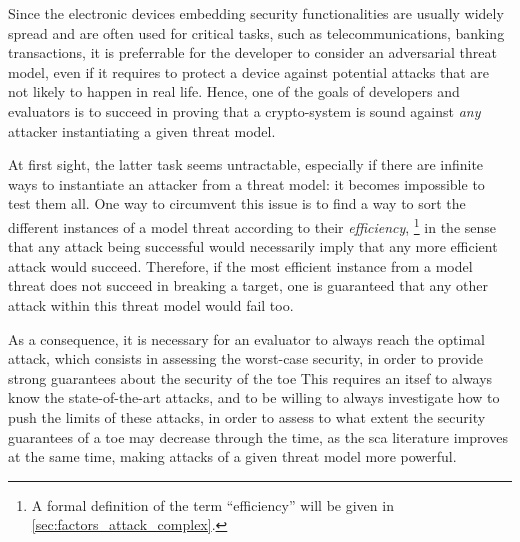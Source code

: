 Since the electronic devices embedding security functionalities are usually widely spread and are often used for critical tasks, such as telecommunications, banking transactions, \etc{} it is preferrable for the developer to consider an adversarial threat model, even if it requires to protect a device against potential attacks that are not likely to happen in real life.
Hence, one of the goals of developers and evaluators is to succeed in proving that a crypto-system is sound against \emph{any} attacker instantiating a given threat model.

At first sight, the latter task seems untractable, especially if there are infinite ways to instantiate an attacker from a threat model: it becomes impossible to test them all.
One way to circumvent this issue is to find a way to sort the different instances of a model threat according to their \emph{efficiency},%
\footnote{
	A formal definition of the term ``efficiency'' will be given in \autoref{sec:factors_attack_complex}.
}
in the sense that any attack being successful would necessarily imply that any more efficient attack would succeed.
Therefore, if the most efficient instance from a model threat does not succeed in breaking a target, one is guaranteed that any other attack within this threat model would fail too.

As a consequence, it is necessary for an evaluator to always reach the optimal attack, which consists in assessing the worst-case security, in order to provide strong guarantees about the security of the \gls{toe}
This requires an \gls{itsef} to always know the state-of-the-art attacks, and to be willing to always investigate how to push the limits of these attacks, in order to assess to what extent the security guarantees of a \gls{toe} may decrease through the time, as the \gls{sca} literature improves at the same time, making attacks of a given threat model more powerful.
